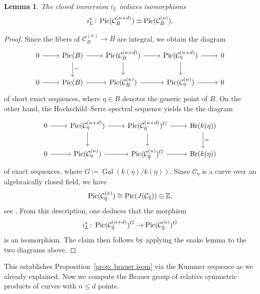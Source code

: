 \documentclass[11pt]{amsart}
\theoremstyle{plain}
\newtheorem{lem}[thm]{Lemma}
\theoremstyle{definition}
\theoremstyle{remark}
\DeclareMathOperator{\Br}{Br}
\DeclareMathOperator{\Gal}{Gal}
\newcommand{\Pic}{\mathop{\rm Pic}\nolimits}
\begin{document}
\begin{lem}\label{lem: pic iso}
    The closed immersion $i_L$ induces isomorphisms 
    $$i_L^* \colon \Pic(\mathcal C_B^{(n+d)}) \simeq \Pic(\mathcal C_B^{(n)}).$$
\end{lem}
\begin{proof}
   
    Since the fibers of $\mathcal C_B^{(n)} \to B$ are integral, we obtain the diagram
    $$\begin{tikzcd}
0 \arrow[r] & \Pic(B) \arrow[d, "="] \arrow[r] & {\Pic(\mathcal C_B^{(n+d)})} \arrow[d] \arrow[r] & {\Pic(\mathcal C^{(n+d)}_\eta)} \arrow[d] \arrow[r] & 0 \\
0 \arrow[r] & \Pic(B) \arrow[r]                & {\Pic(\mathcal C_B^{(n)})} \arrow[r]             & {\Pic(\mathcal C^{(n)}_\eta)} \arrow[r]             & 0
\end{tikzcd}$$
    of short exact sequences, where $\eta \in B$ denotes the generic point of $B$. On the other hand, the Hochschild--Serre spectral sequence yields the the diagram
    $$\begin{tikzcd}
0 \arrow[r] & {\Pic(\mathcal C^{(n+d)}_\eta)} \arrow[d] \arrow[r] & {\Pic(\mathcal C_{\overline{\eta}}^{(n+d)})^G} \arrow[d] \arrow[r]& \Br(k(\eta)) \arrow[d, "="] \\
0 \arrow[r] & {\Pic(\mathcal C_\eta^{(n)})} \arrow[r]             & {\Pic(\mathcal C_{\overline{\eta}}^{(n)})^{G}} \arrow[r]          & \Br(k(\eta))               
\end{tikzcd}$$
of exact sequences, where $G \coloneq \Gal(k(\overline{\eta})/k(\eta))$. Since $\mathcal C_{\overline{\eta}}$ is a curve over an algebraically closed field, we have
$$\Pic(\mathcal C^{(n)}_{\overline{\eta}}) \cong \Pic(J(\mathcal C_{\overline{\eta}})) \oplus \mathbb Z,$$
see \cite[Theorem~3]{Collino}. From this description, one deduces that the morphism
$$i_L^* \colon \Pic(\mathcal C^{(n+d)}_{\overline{\eta}})^G \to \Pic(\mathcal C^{(n)}_{\overline{\eta}})^G$$
is an isomorphism. The claim then follows by applying the snake lemma to the two diagrams above.
\end{proof}

This establishes Proposition~\ref{prop: brauer isom} via the Kummer sequence as we already explained. Now we compute the Brauer group of relative symmetric products of curves with $n\leq d $ points.
\end{document}
